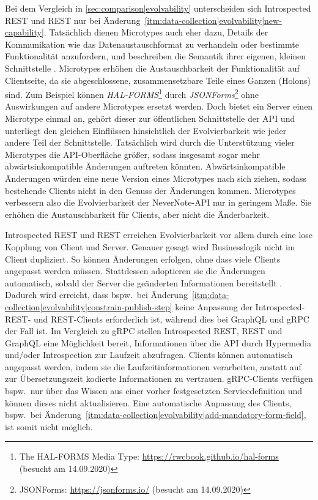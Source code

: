 Bei dem Vergleich in \cref{sec:comparison|evolvability} unterscheiden sich Introspected REST und REST nur bei Änderung~\ref{itm:data-collection|evolvability|new-capability}. Tatsächlich dienen Microtypes auch eher dazu, Details der Kommunikation wie das Datenaustauschformat zu verhandeln oder bestimmte Funktionalität anzufordern, und beschreiben die Semantik ihrer eigenen, kleinen Schnittstelle \autocite{Vasilakis2017a}. Microtypes erhöhen die Austauschbarkeit der Funktionalität auf Clientseite, da sie abgeschlossene, zusammensetzbare Teile eines Ganzen (Holons) sind. Zum Beispiel können \emph{HAL-FORMS}\footnote{The HAL-FORMS Media Type: \url{https://rwcbook.github.io/hal-forms} (besucht am 14.09.2020)} durch \emph{JSONForms}\footnote{JSONForms: \url{https://jsonforms.io/} (besucht am 14.09.2020)} ohne Auswirkungen auf andere Microtypes ersetzt werden. Doch bietet ein Server einen Microtype einmal an, gehört dieser zur öffentlichen Schnittstelle der API und unterliegt den gleichen Einflüssen hinsichtlich der Evolvierbarkeit wie jeder andere Teil der Schnittstelle. Tatsächlich wird durch die Unterstützung vieler Microtypes die API-Oberfläche größer, sodass insgesamt sogar mehr abwärtsinkompatible Änderungen auftreten könnten. Abwärtsinkompatible Änderungen würden eine neue Version eines Microtypes nach sich ziehen, sodass bestehende Clients nicht in den Genuss der Änderungen kommen. Microtypes verbessern also die Evolvierbarkeit der NeverNote-API nur in geringem Maße. Sie erhöhen die Austauschbarkeit für Clients, aber nicht die Änderbarkeit.

\para{}Introspected REST und REST erreichen Evolvierbarkeit vor allem durch eine lose Kopplung von Client und Server. Genauer gesagt wird Businesslogik nicht im Client dupliziert. So können Änderungen erfolgen, ohne dass viele Clients angepasst werden müssen. Stattdessen adoptieren sie die Änderungen automatisch, sobald der Server die geänderten Informationen bereitstellt \autocite[37:35--38:47]{Drotbohm2019}. Dadurch wird erreicht, dass bspw.\ bei Änderung~\ref{itm:data-collection|evolvability|constrain-publish-step} keine Anpassung der Introspected-REST- und REST-Clients erforderlich ist, während dies bei GraphQL und gRPC der Fall ist. Im Vergleich zu gRPC stellen Introspected REST, REST und GraphQL eine Möglichkeit bereit, Informationen über die API durch Hypermedia und/oder Introspection zur Laufzeit abzufragen. Clients können automatisch angepasst werden, indem sie die Laufzeitinformationen verarbeiten, anstatt auf zur Übersetzungszeit kodierte Informationen zu vertrauen. gRPC-Clients verfügen bspw.\ nur über das Wissen aus einer vorher festgesetzten Servicedefinition und können dieses nicht aktualisieren. Eine automatische Anpassung des Clients, bspw.\ bei Änderung~\ref{itm:data-collection|evolvability|add-mandatory-form-field}, ist somit nicht möglich.

